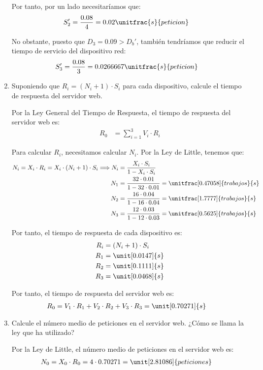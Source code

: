 \begin{ejercicio}
\begin{enumerate}
        Por tanto, por un lado necesitaríamos que:
        \begin{align*}
            S_2' &= \dfrac{0.08}{4} = 0.02 \unitfrac{s}{peticion}
        \end{align*}

        No obstante, puesto que $D_3=0.09>D_b'$, también tendríamos que reducir el tiempo de servicio del dispositivo red:
        \begin{align*}
            S_3' &= \dfrac{0.08}{3} = 0.0266667 \unitfrac{s}{peticion}
        \end{align*}
        \item Suponiendo que $R_i=(N_i+1)\cdot S_i$ para cada dispositivo, calcule el tiempo de respuesta del servidor web.
        
        Por la Ley General del Tiempo de Respuesta, el tiempo de respuesta del servidor web es:
        \begin{align*}
            R_0 &= \sum_{i=1}^{3} V_i \cdot R_i
        \end{align*}

        Para calcular $R_i$, necesitamos calcular $N_i$. Por la Ley de Little, tenemos que:
        \begin{align*}
            N_i = X_i \cdot R_i
            = X_i \cdot (N_i + 1) \cdot S_i
            \Longrightarrow N_i &= \dfrac{X_i \cdot S_i}{1 - X_i \cdot S_i}\\
            N_1 &= \dfrac{32 \cdot 0.01}{1 - 32 \cdot 0.01} = \unitfrac[0.47058]{trabajos}{s} \\
            N_2 &= \dfrac{16 \cdot 0.04}{1 - 16 \cdot 0.04} = \unitfrac[1.7777]{trabajos}{s} \\
            N_3 &= \dfrac{12 \cdot 0.03}{1 - 12 \cdot 0.03} = \unitfrac[0.5625]{trabajos}{s}
        \end{align*}

        Por tanto, el tiempo de respuesta de cada dispositivo es:
        \begin{align*}
            R_i &= (N_i + 1) \cdot S_i\\
            R_1 &= \unit[0.0147]{s} \\
            R_2 &= \unit[0.1111]{s} \\
            R_3 &= \unit[0.0468]{s}
        \end{align*}

        Por tanto, el tiempo de respuesta del servidor web es:
        \begin{align*}
            R_0 &= V_1 \cdot R_1 + V_2 \cdot R_2 + V_3 \cdot R_3 = \unit[0.70271]{s}
        \end{align*}
        \item Calcule el número medio de peticiones en el servidor web. ¿Cómo se llama la ley que ha utilizado?
        
        Por la Ley de Little, el número medio de peticiones en el servidor web es:
        \begin{align*}
            N_0 &= X_0 \cdot R_0 = 4 \cdot 0.70271 = \unit[2.81086]{peticiones}
        \end{align*}
    \end{enumerate}
\end{ejercicio}
